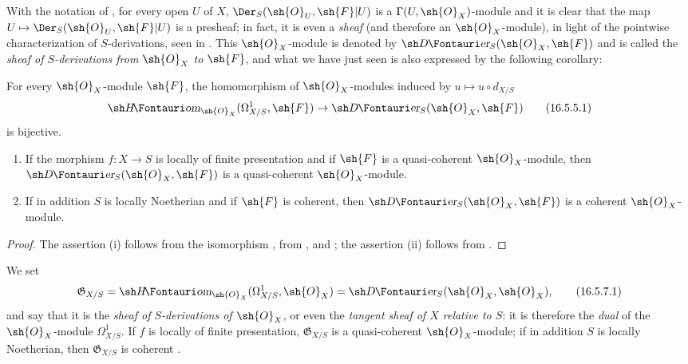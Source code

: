 \begin{env}[16.5.4]
\label{IV.16.5.4}
With the notation of , for every open $U$ of $X$, $\Der_S(\sh{O}_U, \sh{F}|U)$ is a $\Gamma(U, \sh{O}_X)$-module and it is clear that the map $U \mapsto \Der_S(\sh{O}_U, \sh{F}|U)$ is a presheaf;
in fact, it is even a \emph{sheaf} (and therefore an $\sh{O}_X$-module), in light of the pointwise characterization of $S$-derivations, seen in .
This $\sh{O}_X$-module is denoted by $\shDer_S(\sh{O}_X, \sh{F})$ and is called the \emph{sheaf of $S$-derivations from $\sh{O}_X$ to $\sh{F}$}, and what we have just seen is also expressed by the following corollary:
\end{env}

\begin{corollary}[16.5.5]
\label{IV.16.5.5}
For every $\sh{O}_X$-module $\sh{F}$, the homomorphism of $\sh{O}_X$-modules induced by $u \mapsto u \circ d_{X/S}$
\[
\label{IV.16.5.5.1}
  \shHom_{\sh{O}_X}(\Omega_{X/S}^1, \sh{F}) \to \shDer_S(\sh{O}_X, \sh{F})
  \tag{16.5.5.1}
\]
is bijective.
\end{corollary}

\begin{corollary}[16.5.6]
\label{IV.16.5.6}
\begin{enumerate}
  \item[{\rm(i)}] If the morphism $f : X \to S$ is locally of finite presentation and if $\sh{F}$ is a quasi-coherent $\sh{O}_X$-module, then $\shDer_S(\sh{O}_X, \sh{F})$ is a quasi-coherent $\sh{O}_X$-module.
  \item[{\rm(ii)}] If in addition $S$ is locally Noetherian and if $\sh{F}$ is coherent, then $\shDer_S(\sh{O}_X, \sh{F})$ is a coherent $\sh{O}_X$-module.
\end{enumerate}
\end{corollary}

\begin{proof}
The assertion (i) follows from the isomorphism , from , and ;
the assertion (ii) follows from .
\end{proof}

\begin{env}[16.5.7]
\label{IV.16.5.7}
We set
\[
\label{IV.16.5.7.1}
  \mathfrak{G}_{X/S} = \shHom_{\sh{O}_X}(\Omega_{X/S}^1, \sh{O}_X) = \shDer_S(\sh{O}_X, \sh{O}_X),
  \tag{16.5.7.1}
\]
and say that it is the \emph{sheaf of $S$-derivations of $\sh{O}_X$}, or even the \emph{tangent sheaf of $X$ relative to $S$}:
it is therefore the \emph{dual} of the $\sh{O}_X$-module $\Omega_{X/S}^1$.
If $f$ is locally of finite presentation,
$\mathfrak{G}_{X/S}$ is a quasi-coherent $\sh{O}_X$-module;
if in addition $S$ is locally Noetherian, then $\mathfrak{G}_{X/S}$ is coherent .
\end{env}

